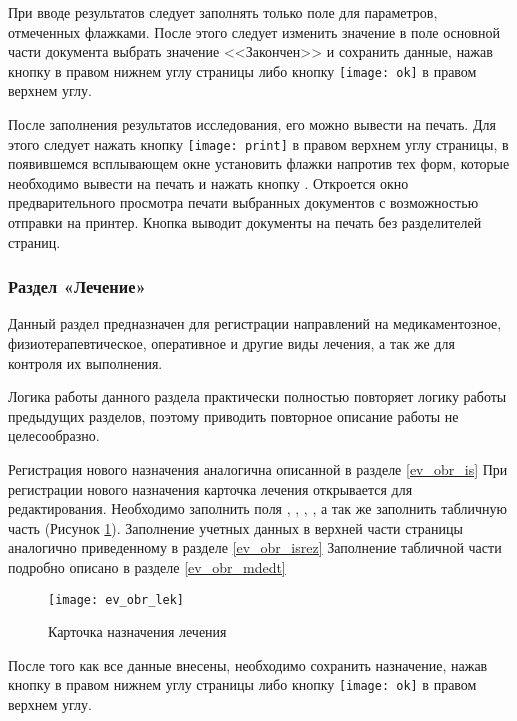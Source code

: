 {{При вводе результатов следует заполнять только поле  для параметров, отмеченных флажками. После этого следует изменить значение в поле  основной части документа выбрать значение <<Закончен>> и сохранить данные, нажав кнопку  в правом нижнем углу страницы либо кнопку \texttt{[image: ok]} в правом верхнем углу.    

После заполнения результатов исследования, его можно вывести на печать. Для этого следует нажать кнопку \texttt{[image: print]} в правом верхнем углу страницы, в появившемся всплывающем окне установить флажки напротив тех форм, которые необходимо вывести на печать и нажать кнопку . Откроется окно предварительного просмотра печати выбранных документов с возможностью отправки на принтер. Кнопка  выводит документы на печать без разделителей страниц.
}{}

{
\subsubsection{Раздел «Лечение»} \label{ev_obr_lek}

Данный раздел предназначен для регистрации направлений на медикаментозное, физиотерапевтическое, оперативное и другие виды лечения, а так же для контроля их выполнения.

Логика работы данного раздела практически полностью повторяет логику работы предыдущих разделов, поэтому приводить повторное описание работы не целесообразно.

Регистрация нового назначения аналогична описанной в разделе \ref{ev_obr_is} При регистрации нового назначения карточка лечения открывается для редактирования. Необходимо заполнить поля , , , , а так же заполнить табличную часть (Рисунок \ref{img_ev_obr_lek}). Заполнение учетных данных в верхней части страницы аналогично приведенному в разделе \ref{ev_obr_isrez} Заполнение табличной части подробно описано в разделе \ref{ev_obr_mdedt}

 \begin{figure}[ht]\centering
   \texttt{[image: ev\_obr\_lek]}
   \caption{Карточка назначения лечения}
   \label{img_ev_obr_lek}
 \end{figure}
 
После того как все данные внесены, необходимо сохранить назначение, нажав кнопку   в правом нижнем углу страницы либо кнопку \texttt{[image: ok]} в правом верхнем углу.    

}}
